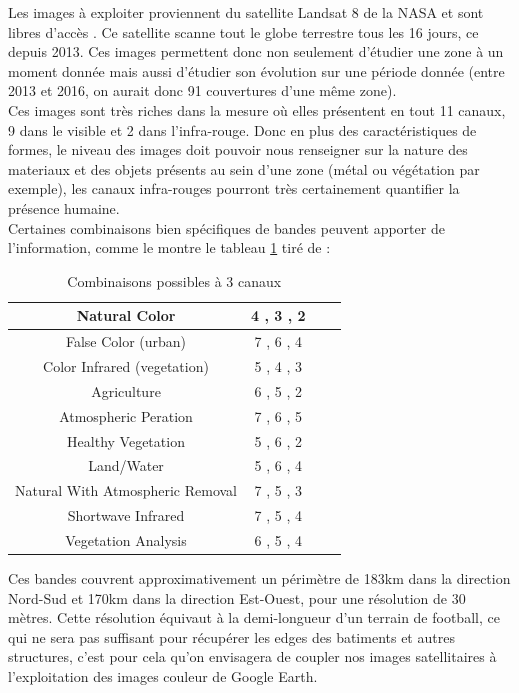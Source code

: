 \documentclass{book}
\begin{document}
Les images à exploiter proviennent du satellite Landsat 8 de la NASA et sont libres d'accès \cite{landsat8}. Ce satellite scanne tout le globe terrestre 
tous les 16 jours, ce depuis 2013. Ces images permettent donc non seulement d'étudier une zone à un moment donnée mais aussi d'étudier son évolution sur
une période donnée (entre 2013 et 2016, on aurait donc 91 couvertures d'une même zone).\\
Ces images sont très riches dans la mesure où elles présentent en tout 11 canaux, 9 dans le visible et 2 dans l'infra-rouge. Donc en plus des caractéristiques de formes, le niveau des images doit pouvoir nous renseigner sur 
la nature des materiaux et des objets présents au sein d'une zone (métal ou végétation par exemple), les canaux infra-rouges pourront très certainement
quantifier la présence humaine.\\
Certaines combinaisons bien spécifiques de bandes peuvent apporter de l'information, comme le montre le tableau \ref{combinaison}
tiré de \cite{esri}:
\begin{table}
\begin{center}
\begin{tabular}{|c|c|c|c|}
\hline
Natural Color & 4 , 3 , 2\\
\hline
False Color (urban) & 7 , 6 , 4\\
\hline
Color Infrared (vegetation) & 5 , 4 , 3\\
\hline
Agriculture & 6 , 5 , 2\\
\hline
Atmospheric Peration & 7 , 6 , 5\\
\hline
Healthy Vegetation & 5 , 6 , 2\\
\hline
Land/Water & 5 , 6 , 4\\
\hline
Natural With Atmospheric Removal & 7 , 5 , 3\\
\hline
Shortwave Infrared & 7 , 5 , 4\\
\hline
Vegetation Analysis & 6 , 5 , 4\\
\hline
\end{tabular}
\end{center}
\caption{Combinaisons possibles à 3 canaux}
\label{combinaison}
\end{table}
\clearpage
Ces bandes couvrent approximativement un périmètre de 183km dans la direction Nord-Sud et 170km
dans la direction Est-Ouest, pour une résolution de 30 mètres. Cette
résolution équivaut à la demi-longueur d'un terrain de football, ce qui ne sera pas
suffisant pour récupérer les edges des batiments et autres structures, c'est pour cela qu'on envisagera de coupler nos images
satellitaires à l'exploitation des images couleur de Google Earth.\\
\end{document}
